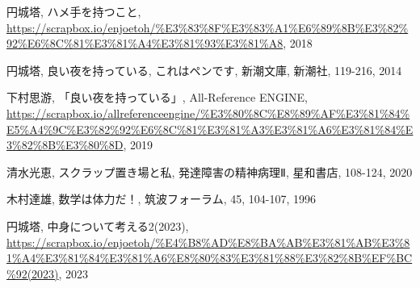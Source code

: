 \documentclass[10pt, a5paper, twoside]{jsarticle}
\theoremstyle{definition}
\begin{document}
	\begin{thebibliography}{99}

		 円城塔, ハメ手を持つこと, \url{https://scrapbox.io/enjoetoh/%E3%83%8F%E3%83%A1%E6%89%8B%E3%82%92%E6%8C%81%E3%81%A4%E3%81%93%E3%81%A8}, 2018

		 円城塔, 良い夜を持っている, これはペンです, 新潮文庫, 新潮社, 119-216, 2014

		 下村思游, 「良い夜を持っている」, All-Reference ENGINE, \url{https://scrapbox.io/allreferenceengine/%E3%80%8C%E8%89%AF%E3%81%84%E5%A4%9C%E3%82%92%E6%8C%81%E3%81%A3%E3%81%A6%E3%81%84%E3%82%8B%E3%80%8D}, 2019

		 清水光恵, スクラップ置き場と私, 発達障害の精神病理Ⅱ, 星和書店, 108-124, 2020

		 木村達雄, 数学は体力だ！, 筑波フォーラム, 45, 104-107, 1996

		 円城塔, 中身について考える2(2023), \url{https://scrapbox.io/enjoetoh/%E4%B8%AD%E8%BA%AB%E3%81%AB%E3%81%A4%E3%81%84%E3%81%A6%E8%80%83%E3%81%88%E3%82%8B%EF%BC%92(2023)}, 2023

	\end{thebibliography}
\end{document}
